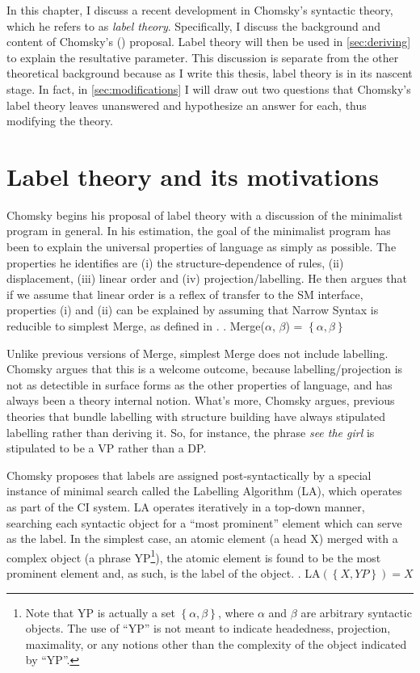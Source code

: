 In this chapter, I discuss a recent development in Chomsky's syntactic theory, which he refers to as \textit{label theory}.
Specifically, I discuss the background and content of Chomsky's (\citeyear{chomsky2013problems,chomsky2015problems}) proposal.
Label theory will then be used in \cref{sec:deriving} to explain the resultative parameter.
This discussion is separate from the other theoretical background because as I write this thesis, label theory is in its nascent stage.
In fact, in \cref{sec:modifications} I will draw out two questions that Chomsky's label theory leaves unanswered and hypothesize an answer for each, thus modifying the theory.
\section{Label theory and its motivations}
Chomsky begins his proposal of label theory with a discussion of the minimalist program in general.
In his estimation, the goal of the minimalist program has been to explain the universal properties of language as simply as possible.
The properties he identifies are (i) the structure-dependence of rules, (ii) displacement, (iii) linear order and (iv) projection/labelling.
He then argues that if we assume that linear order is a reflex of transfer to the SM interface, properties (i) and (ii) can be explained by assuming that Narrow Syntax is reducible to simplest Merge, as defined in \Next.
\ex. Merge($\alpha$, $\beta$) = $\left\{ \alpha, \beta \right\}$

Unlike previous versions of Merge, simplest Merge does not include labelling.
Chomsky argues that this is a welcome outcome, because labelling/projection is not as detectible in surface forms as the other properties of language, and has always been a theory internal notion.
What's more, Chomsky argues, previous theories that bundle labelling with structure building have always stipulated labelling rather than deriving it.
So, for instance, the phrase \textit{see the girl} is stipulated to be a VP rather than a DP.

Chomsky proposes that labels are assigned post-syntactically by a special instance of minimal search called the Labelling Algorithm (LA), which operates as part of the CI system.
LA operates iteratively in a top-down manner, searching each syntactic object for a ``most prominent'' element which can serve as the label.
In the simplest case, an atomic element (a head X) merged with a complex object (a phrase YP\footnote{
		Note that YP is actually a set $\left\{ \alpha,\beta \right\}$, where $\alpha$ and $\beta$ are arbitrary syntactic objects.
		The use of ``YP'' is not meant to indicate headedness, projection, maximality, or any notions other than the complexity of the object indicated by ``YP''. 
}), the atomic element is found to be the most prominent element and, as such, is the label of the object.
\ex. LA$(\left\{ X, YP \right\}) = X$


